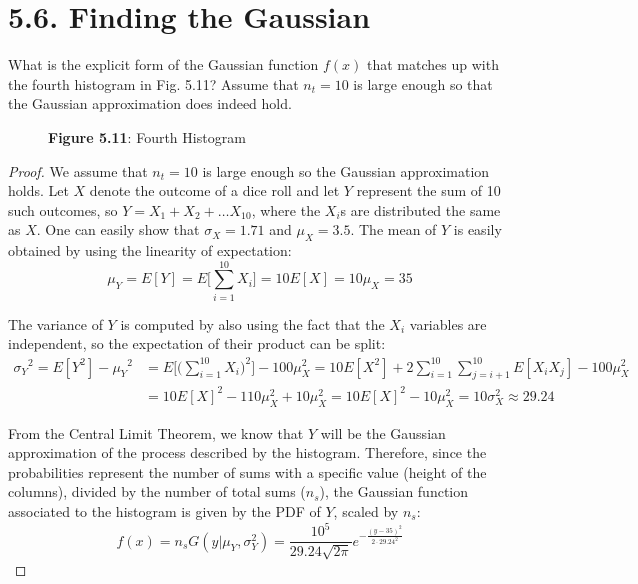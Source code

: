 \section*{5.6. Finding the Gaussian}
What is the explicit form of the Gaussian function $f(x)$ that matches
up with the fourth histogram in Fig. 5.11? Assume that $n_t = 10$ is large
enough so that the Gaussian approximation does indeed hold.

\begin{figure}[H]
    \caption*{\textbf{Figure 5.11}: Fourth Histogram}
\end{figure}

\vspace{1em}

\begin{proof}
    We assume that $n_t = 10$ is large enough so the Gaussian approximation holds.
    Let $X$ denote the outcome of a dice roll and let $Y$ represent the sum of 10 such outcomes,
    so $Y = X_1 + X_2 + \ldots X_{10}$, where the $X_i$s are distributed the same as $X$.
    One can easily show that $\sigma_X = 1.71$ and $\mu_X = 3.5$. The mean of $Y$ is easily
    obtained by using the linearity of expectation:
    \[
        \mu_Y = E[Y] = E\bigg[\sum_{i = 1}^{10}X_i\bigg] = 10E[X] = 10\mu_X = 35
    \] 

    The variance of $Y$ is computed by also using the fact that the $X_i$ variables
    are independent, so the expectation of their product can be split:
    \begin{align*}
        {\sigma_Y}^2 
        = E[Y^2] - {\mu_Y}^2 
        &= E\bigg[\bigg(\sum_{i = 1}^{10} X_i\bigg)^2\bigg] - 100\mu_X^2 
        = 10E[X^2] + 2\sum_{i = 1}^{10}\sum_{j = i + 1}^{10} E[X_i X_j] - 100\mu_X^2 \\
        &= 10E[X]^2 - 110\mu_X^2 + 10\mu_X^2 
        = 10E[X]^2 - 10\mu_X^2 = 10\sigma_X^2 \approx 29.24
    \end{align*}

    From the Central Limit Theorem, we know that $Y$ will be the Gaussian approximation 
    of the process described by the histogram. Therefore, since the probabilities
    represent the number of sums with a specific value (height of the columns), divided
    by the number of total sums ($n_s$), the Gaussian function associated to the histogram
    is given by the PDF of $Y$, scaled by $n_s$:
    \[
        f(x) = n_s G(y | \mu_Y, \sigma_Y^2) 
        = \frac{10^5}{29.24\sqrt{2\pi}} e^{-\frac{(y - 35)^2}{2\cdot 29.24^2}}
    \] 
\end{proof}

